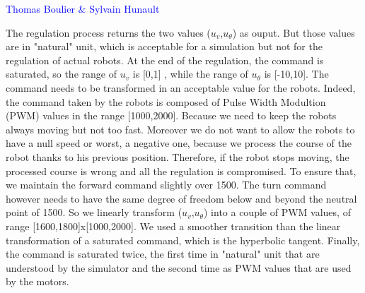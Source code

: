\vspace*{0.5 cm}
	\textcolor{blue} {Thomas Boulier & Sylvain Hunault}
\vspace*{0.5cm}

The regulation process returns the two values ($u_v$,$u_{\theta}$) as ouput. But those values are in "natural" unit, which is acceptable for a simulation but not for the regulation of actual robots.
At the end of the regulation, the command is saturated, so the range of $u_v$ is [0,1] , while the range of $u_{\theta}$ is [-10,10].
The command needs to be transformed in an acceptable value for the robots.
Indeed, the command taken by the robots is composed of Pulse Width Modultion (PWM) values in the range [1000,2000]. Because we need to keep the robots always moving but not too fast. Moreover we do not want to allow the robots to have a null speed or worst, a negative one, because we process the course of the robot thanks to his previous position. Therefore, if the robot stops moving, the processed course is wrong and all the regulation is compromised.
To ensure that, we maintain the forward command slightly over 1500. The turn command however needs to have the same degree of freedom below and beyond the neutral point of 1500.
So we linearly transform  ($u_v$,$u_{\theta}$) into a couple of PWM values, of range [1600,1800]x[1000,2000]. 
We used a smoother transition than the linear transformation of a saturated command, which is the hyperbolic tangent.
Finally, the command is saturated twice, the first time in "natural" unit that are understood by the simulator and the second time as PWM values that are used by the motors.